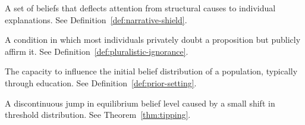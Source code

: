 \begin{description}[style=nextline, leftmargin=3cm]
\item[Narrative shield] A set of beliefs that deflects attention from structural causes to individual explanations. See Definition~\ref{def:narrative-shield}.

\item[Pluralistic ignorance] A condition in which most individuals privately doubt a proposition but publicly affirm it. See Definition~\ref{def:pluralistic-ignorance}.

\item[Prior-setting power] The capacity to influence the initial belief distribution of a population, typically through education. See Definition~\ref{def:prior-setting}.

\item[Tipping point] A discontinuous jump in equilibrium belief level caused by a small shift in threshold distribution. See Theorem~\ref{thm:tipping}.

\end{description}
